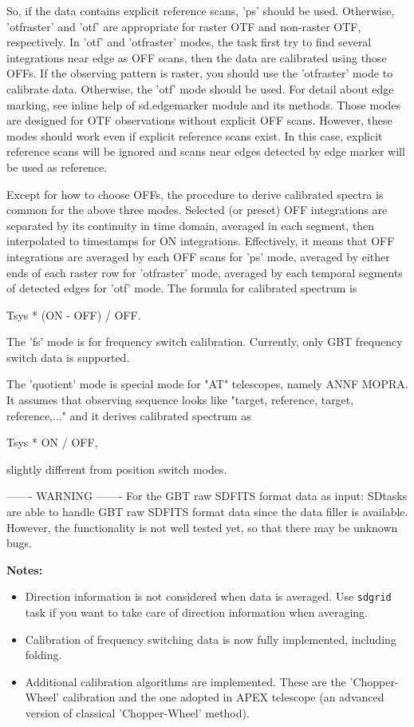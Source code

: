 So, if the data contains explicit reference scans, 'ps' should
be used. Otherwise, 'otfraster' and 'otf' are appropriate for
raster OTF and non-raster OTF, respectively. In 'otf' and
'otfraster' modes, the task first try to find several integrations 
near edge as OFF scans, then the data are calibrated using those 
OFFs. If the observing pattern is raster, you 
should use the 'otfraster' mode to calibrate data. Otherwise, the 
'otf' mode should be used. For detail about edge marking, see 
inline help of sd.edgemarker module and its methods.
Those modes are designed for OTF observations without 
explicit OFF scans. However, these modes should work even if
explicit reference scans exist. In this case, explicit reference
scans will be ignored and scans near edges detected by edge
marker will be used as reference.

Except for how to choose OFFs, the procedure to derive calibrated
spectra is common for the
above three modes. Selected (or preset) OFF integrations are
separated by its continuity in time domain, averaged in
each segment, then interpolated to timestamps for ON integrations.
Effectively, it means that OFF integrations are averaged by each
OFF scans for 'ps' mode, averaged by either ends of each raster
row for 'otfraster' mode, averaged by each temporal segments of
detected edges for 'otf' mode. The formula for calibrated spectrum
is

    Tsys * (ON - OFF) / OFF. 

The 'fs' mode is for frequency switch calibration. Currently,
only GBT frequency switch data is supported.

The 'quotient' mode is special mode for "AT" telescopes, namely
ANNF MOPRA. It assumes that observing sequence looks like
"target, reference, target, reference,..." and it derives
calibrated spectrum as

    Tsys * ON / OFF,

slightly different from position switch modes.
  
-------
WARNING
-------
For the GBT raw SDFITS format data as input:
SDtasks are able to handle GBT raw SDFITS format data since the 
data filler is available. However, the functionality is not well 
tested yet, so that there may be unknown bugs. 

{\bf Notes:}
 \begin{itemize}
  \item Direction information is not considered when data is averaged. 
Use {\tt sdgrid} task if you want to take care of direction information 
when averaging.
  \item Calibration of frequency switching data is now fully implemented, including folding.
  \item Additional calibration algorithms are implemented. These are the
'Chopper-Wheel' calibration and the one adopted in APEX telescope (an advanced version of classical 'Chopper-Wheel' method). 
\end{itemize}


